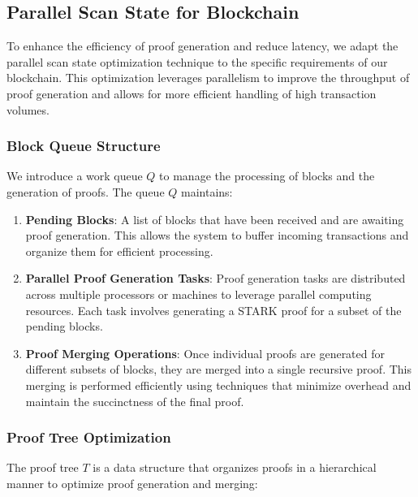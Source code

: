 \documentclass{article}
\theoremstyle{plain}
\theoremstyle{definition}
\theoremstyle{remark}
\theoremstyle{problem}
\begin{document}
\subsection{Parallel Scan State for Blockchain}

To enhance the efficiency of proof generation and reduce latency, we adapt the parallel scan state optimization technique to the specific requirements of our blockchain. This optimization leverages parallelism to improve the throughput of proof generation and allows for more efficient handling of high transaction volumes.

\subsubsection{Block Queue Structure}

We introduce a work queue $Q$ to manage the processing of blocks and the generation of proofs. The queue $Q$ maintains:

\begin{enumerate}
    \item \textbf{Pending Blocks}: A list of blocks that have been received and are awaiting proof generation. This allows the system to buffer incoming transactions and organize them for efficient processing.

    \item \textbf{Parallel Proof Generation Tasks}: Proof generation tasks are distributed across multiple processors or machines to leverage parallel computing resources. Each task involves generating a STARK proof for a subset of the pending blocks.

    \item \textbf{Proof Merging Operations}: Once individual proofs are generated for different subsets of blocks, they are merged into a single recursive proof. This merging is performed efficiently using techniques that minimize overhead and maintain the succinctness of the final proof.
\end{enumerate}

\subsubsection{Proof Tree Optimization}

The proof tree $T$ is a data structure that organizes proofs in a hierarchical manner to optimize proof generation and merging:
\end{document}
